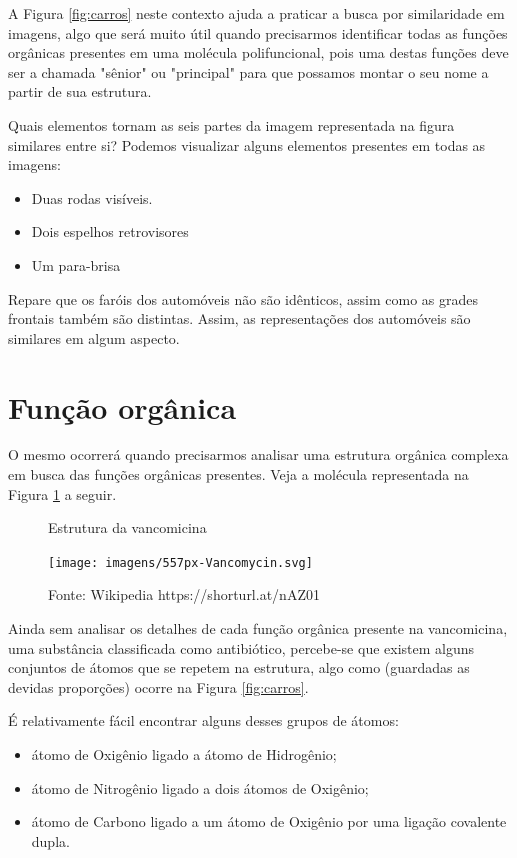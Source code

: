 A Figura \ref{fig:carros} neste contexto ajuda a praticar a busca por similaridade em imagens, algo que será muito útil quando precisarmos identificar todas as funções orgânicas presentes em uma molécula polifuncional, pois uma destas funções deve ser a chamada "sênior" ou "principal" para que possamos montar o seu nome a partir de sua estrutura.

Quais elementos tornam as seis partes da imagem representada na figura similares entre si? Podemos visualizar alguns elementos presentes em todas as imagens:

\begin{itemize}
	\item Duas rodas visíveis.
	\item Dois espelhos retrovisores
	\item Um para-brisa
\end{itemize}

Repare que os faróis dos automóveis não são idênticos, assim como as grades frontais também são distintas. Assim, as representações dos automóveis são similares em algum aspecto.

\section{Função orgânica}
O mesmo ocorrerá quando precisarmos analisar uma estrutura orgânica complexa em busca das funções orgânicas presentes. Veja a molécula representada na Figura \ref{fig:vanco} a seguir.

\begin{figure}[h]
	\centering
	\caption{Estrutura da vancomicina}
	\vspace{0.5cm}
	\texttt{[image: imagens/557px-Vancomycin.svg]}
	\caption*{Fonte: Wikipedia https://shorturl.at/nAZ01}
	\label{fig:vanco}
\end{figure}

Ainda sem analisar os detalhes de cada função orgânica presente na vancomicina, uma substância classificada como antibiótico, percebe-se que existem alguns conjuntos de átomos que se repetem na estrutura, algo como (guardadas as devidas proporções) ocorre na Figura \ref{fig:carros}.

É relativamente fácil encontrar alguns desses grupos de átomos:

\begin{itemize}
	\item átomo de Oxigênio ligado a átomo de Hidrogênio;
	\item átomo de Nitrogênio ligado a dois átomos de Oxigênio;
	\item átomo de Carbono ligado a um átomo de Oxigênio por uma ligação covalente dupla.
\end{itemize}

